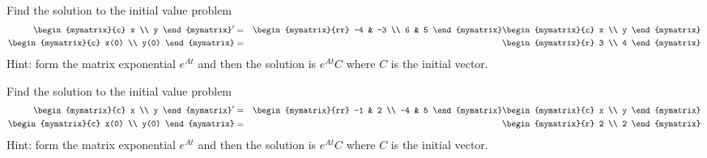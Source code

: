 \begin{enumialphparenastyle}
\begin{ex}
 Find the solution to the initial value problem 
\begin{eqnarray*}
\begin{mymatrix}{c}
x \\ 
y 
\end{mymatrix} ^{\prime } &=&\begin{mymatrix}{rr}
-4 & -3 \\ 
6 & 5 
\end{mymatrix} \begin{mymatrix}{c}
x \\ 
y 
\end{mymatrix} \\
\begin{mymatrix}{c}
x(0) \\ 
y(0) 
\end{mymatrix} &=&\begin{mymatrix}{r}
3 \\ 
4 
\end{mymatrix}
\end{eqnarray*} 
Hint: form the matrix exponential $e^{At}$ and then the solution is $e^{At}C$ where $C$ is the initial vector. 
\end{ex}

\begin{ex}
Find the solution to the initial value problem 
\begin{eqnarray*}
\begin{mymatrix}{c}
x \\ 
y 
\end{mymatrix} ^{\prime } &=&\begin{mymatrix}{rr}
-1 & 2 \\ 
-4 & 5 
\end{mymatrix} \begin{mymatrix}{c}
x \\ 
y 
\end{mymatrix} \\
\begin{mymatrix}{c}
x(0) \\ 
y(0) 
\end{mymatrix} &=&\begin{mymatrix}{r}
2 \\ 
2 
\end{mymatrix}
\end{eqnarray*} 
Hint: form the matrix exponential $e^{At}$ and then the solution is $e^{At}C$ where $C$ is the initial vector. 
\end{ex}

\end{enumialphparenastyle}
